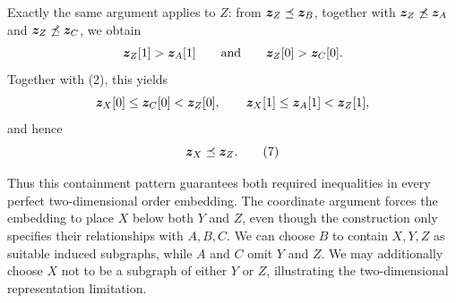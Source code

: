 \begin{solution}
Exactly the same argument applies to \(Z\): from
\(\bm{z}_Z\preceq\bm{z}_B\), together with
\(\bm{z}_Z\not\preceq\bm{z}_A\) and
\(\bm{z}_Z\not\preceq\bm{z}_C\), we
obtain
\[
  \bm{z}_Z[1]>\bm{z}_A[1]
  \qquad\text{and}\qquad
  \bm{z}_Z[0]>\bm{z}_C[0].
\]
Together with (2), this yields
\[
  \bm{z}_X[0]\leq\bm{z}_C[0]<\bm{z}_Z[0],
  \qquad
  \bm{z}_X[1]\leq\bm{z}_A[1]<\bm{z}_Z[1],
\]
and hence
\[
  \bm{z}_X\preceq\bm{z}_Z.
  \tag{7}
\]

Thus this containment pattern guarantees both required inequalities in every
perfect two-dimensional order embedding. The coordinate argument forces the
embedding to place \(X\) below both \(Y\) and \(Z\), even though the
construction only specifies their relationships with \(A,B,C\). We can
choose \(B\) to contain \(X,Y,Z\) as suitable induced subgraphs, while \(A\)
and \(C\) omit \(Y\) and \(Z\). We may additionally choose \(X\) not to be a
subgraph of either \(Y\) or \(Z\), illustrating the two-dimensional
representation limitation.
\end{solution}
